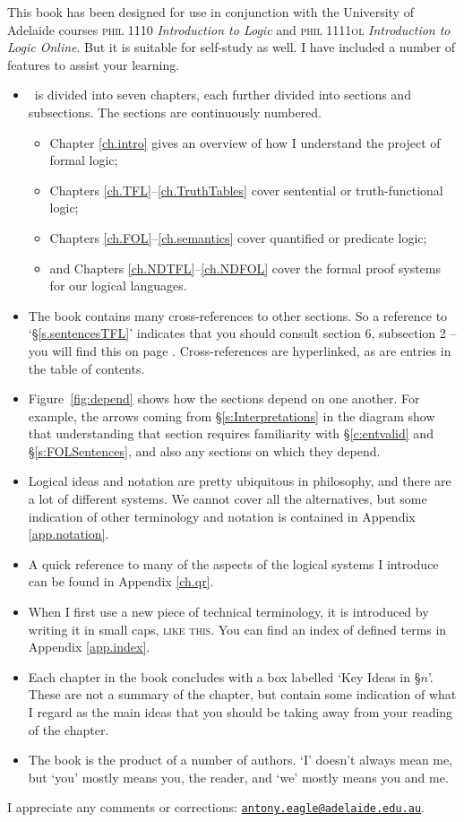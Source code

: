 This book has been designed for use in conjunction with the University of Adelaide courses \textsc{phil} 1110 \emph{Introduction to Logic} and \textsc{phil 1111ol} \emph{Introduction to Logic Online}. But it is suitable for self-study as well. I have included a number of features to assist your learning. \begin{itemize}
	\item \forallx\ is divided into seven chapters, each further divided into sections and subsections. The sections are continuously numbered. \begin{itemize}
		\item Chapter \ref{ch.intro} gives an overview of how I understand the project of formal logic;
		\item Chapters \ref{ch.TFL}–\ref{ch.TruthTables} cover sentential or truth-functional logic;
		\item Chapters \ref{ch.FOL}–\ref{ch.semantics} cover quantified or predicate logic;
		\item and Chapters \ref{ch.NDTFL}–\ref{ch.NDFOL} cover the formal proof systems for our logical languages.
	\end{itemize}
	\item The book contains many cross-references to other sections. So a reference to `§\ref{s.sentencesTFL}' indicates that you should consult section 6, subsection 2 – you will find this on page \pageref{s.sentencesTFL}. Cross-references are hyperlinked, as are entries in the table of contents.
	\item  Figure~\ref{fig:depend} shows how the sections depend on one another. For example, the arrows coming from §\ref{s:Interpretations} in the diagram show that understanding that section requires familiarity with §\ref{c:entvalid} and §\ref{s:FOLSentences}, and also any sections on which they depend.
	\item Logical ideas and notation are pretty ubiquitous in philosophy, and there are a lot of different systems. We cannot cover all the alternatives, but some indication of other terminology and notation is contained in Appendix \ref{app.notation}.
	\item A quick reference to many of the aspects of the logical systems I introduce can be found in Appendix \ref{ch.qr}.
	\item When I first use a new piece of technical terminology, it is introduced by writing it in small caps, \textsc{like this}. You can find an index of defined terms in Appendix \ref{app.index}.
	\item Each chapter in the book concludes with a box labelled `Key Ideas in §$n$'. These are not a summary of the chapter, but contain some indication of what I regard as the main ideas that you should be taking away from your reading of the chapter. 
	\item The book is the product of a number of authors. `I' doesn't always mean me, but `you' mostly means you, the reader, and `we' mostly means you and me.
\end{itemize}
I appreciate any comments or corrections: \href{mailto:antony.eagle@adelaide.edu.au}{\nolinkurl{antony.eagle@adelaide.edu.au}}.

